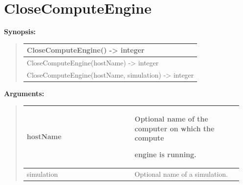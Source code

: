 \documentclass[letterpaper,10pt,english]{sphinxmanual}
\begin{document}
\section{CloseComputeEngine}
\label{functions:closecomputeengine}
\begin{DUlineblock}{0em}
\item[] \textbf{Synopsis:}
\end{DUlineblock}
\begin{quote}

\begin{tabulary}{\linewidth}{|L|}
\hline

CloseComputeEngine() -\textgreater{} integer
\\
\hline
CloseComputeEngine(hostName) -\textgreater{} integer
\\
\hline
CloseComputeEngine(hostName, simulation) -\textgreater{} integer
\\
\hline\end{tabulary}

\end{quote}

\begin{DUlineblock}{0em}
\item[] 
\item[] \textbf{Arguments:}
\end{DUlineblock}
\begin{quote}

\begin{tabular}{|p{0.475\linewidth}|p{0.475\linewidth}|}
\hline

hostName
 & 
\begin{DUlineblock}{0em}
\item[] Optional name of the computer on which the compute
\item[] engine is running.
\end{DUlineblock}
\\
\hline
simulation
 & 
Optional name of a simulation.
\\
\hline\end{tabular}

\end{quote}
\end{document}
